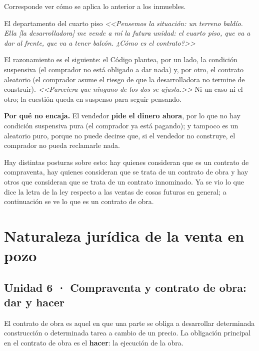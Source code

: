 \documentclass[12pt,oneside]{book}
\begin{document}
Corresponde ver cómo se aplica lo anterior a los inmuebles.

\begin{example}{El departamento del cuarto piso}
\textit{<<Pensemos la situación: un terreno baldío. Ella [la desarrolladora] me vende a mí la futura unidad: el cuarto piso, que va a dar al frente, que va a tener balcón. ¿Cómo es el contrato?>>}
\end{example}

El razonamiento es el siguiente: el Código plantea, por un lado, la condición suspensiva (el comprador no está obligado a dar nada) y, por otro, el contrato aleatorio (el comprador asume el riesgo de que la desarrolladora no termine de construir). \textit{<<Pareciera que ninguno de los dos se ajusta.>>} Ni un caso ni el otro; la cuestión queda en suspenso para seguir pensando.

\begin{important}
\textbf{Por qué no encaja.} El vendedor \textbf{pide el dinero ahora}, por lo que no hay condición suspensiva pura (el comprador ya está pagando); y tampoco es un aleatorio puro, porque no puede decirse que, si el vendedor no construye, el comprador no pueda reclamarle nada.
\end{important}

Hay distintas posturas sobre esto: hay quienes consideran que es un contrato de compraventa, hay quienes consideran que se trata de un contrato de obra y hay otros que consideran que se trata de un contrato innominado. Ya se vio lo que dice la letra de la ley respecto a las ventas de cosas futuras en general; a continuación se ve lo que es un contrato de obra.

\chapter{Naturaleza jurídica de la venta en pozo}

\section{Unidad 6 · Compraventa y contrato de obra: dar y hacer}

El contrato de obra es aquel en que una parte se obliga a desarrollar determinada construcción o determinada tarea a cambio de un precio. La obligación principal en el contrato de obra es el \textbf{hacer}: la ejecución de la obra.
\end{document}
